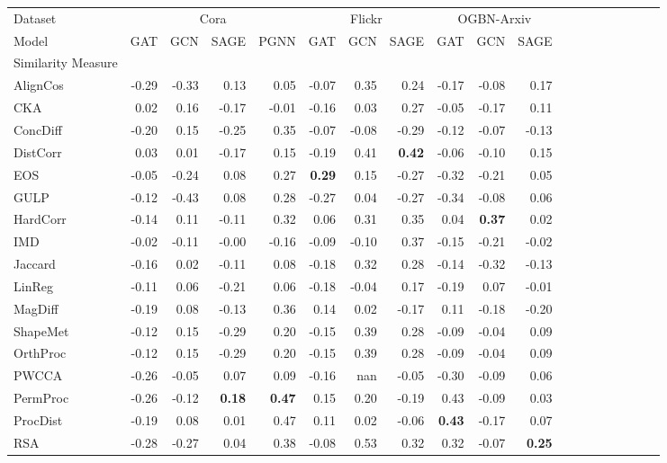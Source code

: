 \begin{tabular}{l||rrr|rrr|rrr||rrr|rrr|rrr}
\toprule
Dataset & \multicolumn{4}{c}{Cora} & \multicolumn{3}{c}{Flickr} & \multicolumn{3}{c}{OGBN-Arxiv} \\
Model & GAT & GCN & SAGE & PGNN & GAT & GCN & SAGE & GAT & GCN & SAGE \\
Similarity Measure &  &  &  &  &  &  &  &  &  &  \\
\midrule
AlignCos & -0.29 & -0.33 & 0.13 & 0.05 & -0.07 & 0.35 & 0.24 & -0.17 & -0.08 & 0.17 \\
CKA & 0.02 & 0.16 & -0.17 & -0.01 & -0.16 & 0.03 & 0.27 & -0.05 & -0.17 & 0.11 \\
ConcDiff & -0.20 & 0.15 & -0.25 & 0.35 & -0.07 & -0.08 & -0.29 & -0.12 & -0.07 & -0.13 \\
DistCorr & 0.03 & 0.01 & -0.17 & 0.15 & -0.19 & 0.41 & \textbf{0.42} & -0.06 & -0.10 & 0.15 \\
EOS & -0.05 & -0.24 & 0.08 & 0.27 & \textbf{0.29} & 0.15 & -0.27 & -0.32 & -0.21 & 0.05 \\
GULP & -0.12 & -0.43 & 0.08 & 0.28 & -0.27 & 0.04 & -0.27 & -0.34 & -0.08 & 0.06 \\
HardCorr & -0.14 & 0.11 & -0.11 & 0.32 & 0.06 & 0.31 & 0.35 & 0.04 & \textbf{0.37} & 0.02 \\
IMD & -0.02 & -0.11 & -0.00 & -0.16 & -0.09 & -0.10 & 0.37 & -0.15 & -0.21 & -0.02 \\
Jaccard & -0.16 & 0.02 & -0.11 & 0.08 & -0.18 & 0.32 & 0.28 & -0.14 & -0.32 & -0.13 \\
LinReg & -0.11 & 0.06 & -0.21 & 0.06 & -0.18 & -0.04 & 0.17 & -0.19 & 0.07 & -0.01 \\
MagDiff & -0.19 & 0.08 & -0.13 & 0.36 & 0.14 & 0.02 & -0.17 & 0.11 & -0.18 & -0.20 \\
ShapeMet & -0.12 & 0.15 & -0.29 & 0.20 & -0.15 & 0.39 & 0.28 & -0.09 & -0.04 & 0.09 \\
OrthProc & -0.12 & 0.15 & -0.29 & 0.20 & -0.15 & 0.39 & 0.28 & -0.09 & -0.04 & 0.09 \\
PWCCA & -0.26 & -0.05 & 0.07 & 0.09 & -0.16 & nan & -0.05 & -0.30 & -0.09 & 0.06 \\
PermProc & -0.26 & -0.12 & \textbf{0.18} & \textbf{0.47} & 0.15 & 0.20 & -0.19 & 0.43 & -0.09 & 0.03 \\
ProcDist & -0.19 & 0.08 & 0.01 & 0.47 & 0.11 & 0.02 & -0.06 & \textbf{0.43} & -0.17 & 0.07 \\
RSA & -0.28 & -0.27 & 0.04 & 0.38 & -0.08 & 0.53 & 0.32 & 0.32 & -0.07 & \textbf{0.25} \\

\end{tabular}
